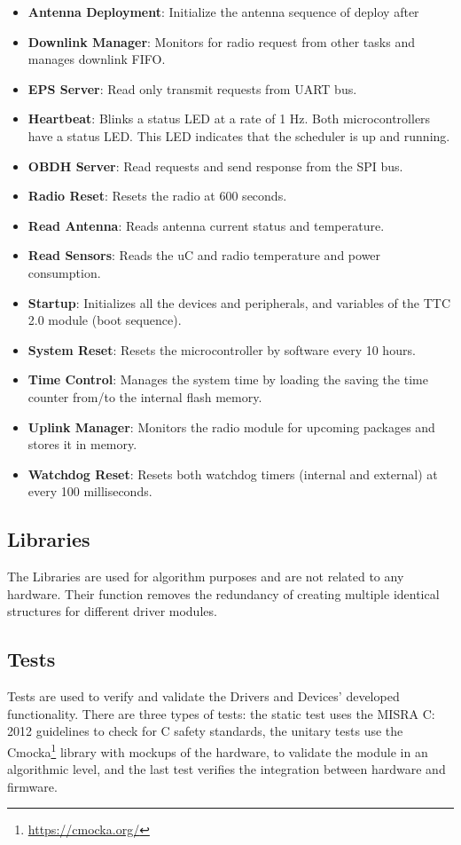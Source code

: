 \begin{itemize}
    \item \textbf{Antenna Deployment}: Initialize the antenna sequence of deploy after 
    \item \textbf{Downlink Manager}: Monitors for radio request from other tasks and manages downlink FIFO.
    \item \textbf{EPS Server}: Read only transmit requests from UART bus.
    \item \textbf{Heartbeat}: Blinks a status LED at a rate of 1 Hz. Both microcontrollers have a status LED. This LED indicates that the scheduler is up and running.
    \item \textbf{OBDH Server}: Read requests and send response from the SPI bus.
    \item \textbf{Radio Reset}: Resets the radio at 600 seconds.
    \item \textbf{Read Antenna}: Reads antenna current status and temperature.
    \item \textbf{Read Sensors}: Reads the uC and radio temperature and power consumption. 
    \item \textbf{Startup}: Initializes all the devices and peripherals, and variables of the TTC 2.0 module (boot sequence).
    \item \textbf{System Reset}: Resets the microcontroller by software every 10 hours.
    \item \textbf{Time Control}: Manages the system time by loading the saving the time counter from/to the internal flash memory.
    \item \textbf{Uplink Manager}: Monitors the radio module for upcoming packages and stores it in memory.
    \item \textbf{Watchdog Reset}: Resets both watchdog timers (internal and external) at every 100 milliseconds.
\end{itemize}

\subsection{Libraries}

The Libraries are used for algorithm purposes and are not related to any hardware. Their function removes the redundancy of creating multiple identical structures for different driver modules.

\subsection{Tests}

Tests are used to verify and validate the Drivers and Devices' developed functionality. There are three types of tests: the static test uses the MISRA C: 2012 \cite{misrac2012} guidelines to check for C safety standards, the unitary tests use the Cmocka\footnote{\href{https://cmocka.org/}{https://cmocka.org/}} library with mockups of the hardware, to validate the module in an algorithmic level, and the last test verifies the integration between hardware and firmware.
